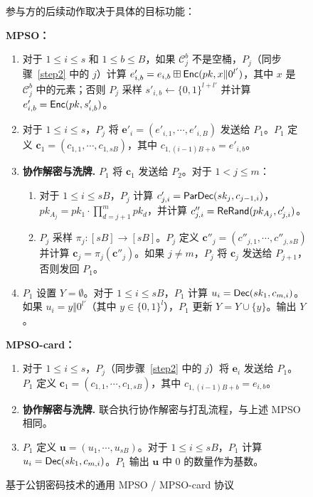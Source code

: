 \begin{figure}[!htbp]
\begin{framed}
\begin{minipage}[c]{\textwidth}
\begin{trivlist}
参与方的后续动作取决于具体的目标功能：

    \item \textbf{MPSO：} 
    \begin{enumerate}[itemsep=2pt,topsep=0pt,parsep=0pt] \addtocounter{enumi}{3}
        \item 对于 $1 \le i \le s$ 和 $1 \le b \le B$，如果 $\mathcal{C}_j^b$ 不是空桶，$P_j$（同步骤~\ref{step2} 中的 $j$）计算 $e'_{i,b} = e_{i,b} \boxplus \mathsf{Enc}(pk,x \Vert 0^{l'})$，其中 $x$ 是 $\mathcal{C}_j^b$ 中的元素；否则 $P_j$ 采样 $s'_{i,b} \gets \{0,1\}^{l+l'}$ 并计算 $e'_{i,b} = \mathsf{Enc}(pk,s'_{i,b})$。
        \item 对于 $1 \le i \le s$，$P_j$ 将 $\textbf{e}'_{i}=(e'_{i,1},\cdots,e'_{i,B})$ 发送给 $P_1$。$P_1$ 定义 $\textbf{c}_1 = (c_{1,1},\cdots,c_{1,sB})$，其中 ${c}_{1,(i-1)B+b} = e'_{i,b}$。
        \item \textbf{协作解密与洗牌.} $P_1$ 将 $\textbf{c}_1$ 发送给 $P_{2}$。对于 $1 < j \le m$： 
        \begin{enumerate}[itemsep=2pt,topsep=0pt,parsep=0pt]
        \item 对于 $1 \le i \le sB$，$P_j$ 计算 $c'_{j,i} = \mathsf{ParDec}(sk_j,c_{j-1,i})$，$pk_{A_j} = pk_1 \cdot \prod_{d = j+1}^m pk_d$，并计算 $c''_{j,i} = \mathsf{ReRand}(pk_{A_j},c'_{j,i})$。 
        \item $P_j$ 采样 $\pi_j:[sB] \to [sB]$。$P_j$ 定义 $\textbf{c}''_j = (c''_{j,1},\cdots,c''_{j,sB})$ 并计算 $\textbf{c}_{j} = {\pi_j}(\textbf{c}''_{j})$。如果 $j \ne m$，$P_j$ 将 $\textbf{c}_{j}$ 发送给 $P_{j+1}$，否则发回 $P_{1}$。
        \end{enumerate}
        \item $P_{1}$ 设置 $Y = \emptyset$。对于 $1 \le i \le sB$，$P_1$ 计算 $u_i = \mathsf{Dec}(sk_1,c_{m,i})$。如果 $u_i = y \Vert 0^{l'}$（其中 $y \in \{0,1\}^l$），$P_1$ 更新 $Y = Y \cup \{y\}$。输出 $Y$。
        \end{enumerate}
    \item \textbf{MPSO-card：} 
    \begin{enumerate}[itemsep=2pt,topsep=0pt,parsep=0pt] \addtocounter{enumi}{3}
        \item 对于 $1 \le i \le s$，$P_j$（同步骤~\ref{step2} 中的 $j$）将 $\textbf{e}_{i}$ 发送给 $P_1$。$P_1$ 定义 $\textbf{c}_1 = (c_{1,1},\cdots,c_{1,sB})$，其中 ${c}_{1,(i-1)B+b} = e_{i,b}$。
        \item \textbf{协作解密与洗牌.} 联合执行协作解密与打乱流程，与上述 MPSO 相同。
        \item $P_{1}$ 定义 $\textbf{u} = (u_1, \cdots, u_{sB})$。对于 $1 \le i \le sB$，$P_1$ 计算 $u_i = \mathsf{Dec}(sk_1,c_{m,i})$。$P_1$ 输出 $\textbf{u}$ 中 0 的数量作为基数。
    \end{enumerate}
\end{trivlist}
\end{minipage}
\end{framed}
\caption{基于公钥密码技术的通用 MPSO / MPSO-card 协议}\label{fig:proto-MPSO2}
\end{figure}

